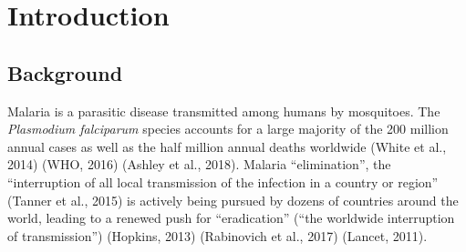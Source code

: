 \documentclass[]{article}
\begin{document}
\noindent{}

\section{Introduction}\label{introduction}

\subsection{Background}\label{background}

Malaria is a parasitic disease transmitted among humans by mosquitoes.
The \emph{Plasmodium falciparum} species accounts for a large majority
of the 200 million annual cases as well as the half million annual
deaths worldwide (White et al., 2014) (WHO, 2016) (Ashley et al., 2018).
Malaria ``elimination'', the ``interruption of all local transmission of
the infection in a country or region'' (Tanner et al., 2015) is actively
being pursued by dozens of countries around the world, leading to a
renewed push for ``eradication'' (``the worldwide interruption of
transmission'') (Hopkins, 2013) (Rabinovich et al., 2017) (Lancet,
2011).
\end{document}
